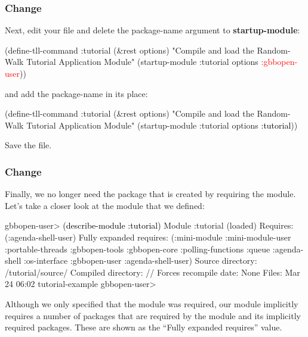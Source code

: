 \documentclass[10pt,twoside,english,pdftex]{article}
\begin{document}
\subsubsection*{Change }
%
Next, edit your  file and delete the 
package-name argument to \textbf{startup-module}:
%
\W\supp
\begin{example}
\textcolor{darkergray}{%
  (define-tll-command :tutorial (\&rest options)
    "Compile and load the Random-Walk Tutorial Application Module"
    (startup-module :tutorial options \textcolor{red}{:gbbopen-user}))}
\end{example}
%
and add the package-name  in its place:
%
\W\supp\notpretop
\begin{example}
\textcolor{darkergray}{%
  (define-tll-command :tutorial (\&rest options)
    "Compile and load the Random-Walk Tutorial Application Module"
    (startup-module :tutorial options \textcolor{black}{:tutorial}))}
\end{example}
%
Save the file.

\subsubsection*{Change }

%
%
Finally, we no longer need the  package that is created by
requiring the  module.  Let's take a closer look at the  module that we defined:
%
\W\supp
\begin{example}
\textcolor{darkergray}{%
  gbbopen-user> \textcolor{black}{(describe-module :tutorial)}
  Module :tutorial (loaded)
    Requires: (:agenda-shell-user)
    Fully expanded requires: (:mini-module :mini-module-user :portable-threads
                              :gbbopen-tools :gbbopen-core :polling-functions
                              :queue :agenda-shell :os-interface :gbbopen-user
                              :agenda-shell-user)
    Source directory: /tutorial/source/
    Compiled directory: //
    Forces recompile date: None
    Files: Mar 24 06:02 tutorial-example
  gbbopen-user>}
\end{example}
%
Although we only specified that the  module was
required, our  module implicitly requires a number of packages
that are required by the  module and its implicitly
required packages.  These are shown as the ``Fully expanded requires'' value.
\end{document}
